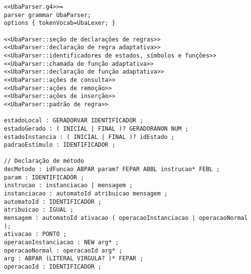 
\begin{lstlisting}[style=antlr]
<<UbaParser.g4>>=
parser grammar UbaParser;
options { tokenVocab=UbaLexer; }

<<UbaParser::seção de declarações de regras>>
<<UbaParser::declaração de regra adaptativa>>
<<UbaParser::identificadores de estados, símbolos e funções>>
<<UbaParser::chamada de função adaptativa>>
<<UbaParser::declaração de função adaptativa>>
<<UbaParser::ações de consulta>>
<<UbaParser::ações de remoção>>
<<UbaParser::ações de inserção>>
<<UbaParser::padrão de regra>>

estadoLocal : GERADORVAR IDENTIFICADOR ;
estadoGerado : ( INICIAL | FINAL )? GERADORANON NUM ;
estadoInstancia : ( INICIAL | FINAL )? idEstado ;
padraoEstimulo : IDENTIFICADOR ;

// Declaração de método
decMetodo : idFuncao ABPAR param? FEPAR ABBL instrucao* FEBL ;
param : IDENTIFICADOR ;
instrucao : instanciacao | mensagem ;
instanciacao : automatoId atribuicao mensagem ;
automatoId : IDENTIFICADOR ;
atribuicao : IGUAL ;
mensagem : automatoId ativacao ( operacaoInstanciacao | operacaoNormal );
ativacao : PONTO ;
operacaoInstanciacao : NEW arg* ;
operacaoNormal : operacaoId arg* ;
arg : ABPAR (LITERAL VIRGULA? )* FEPAR ;
operacaoId : IDENTIFICADOR ;
\end{lstlisting}
